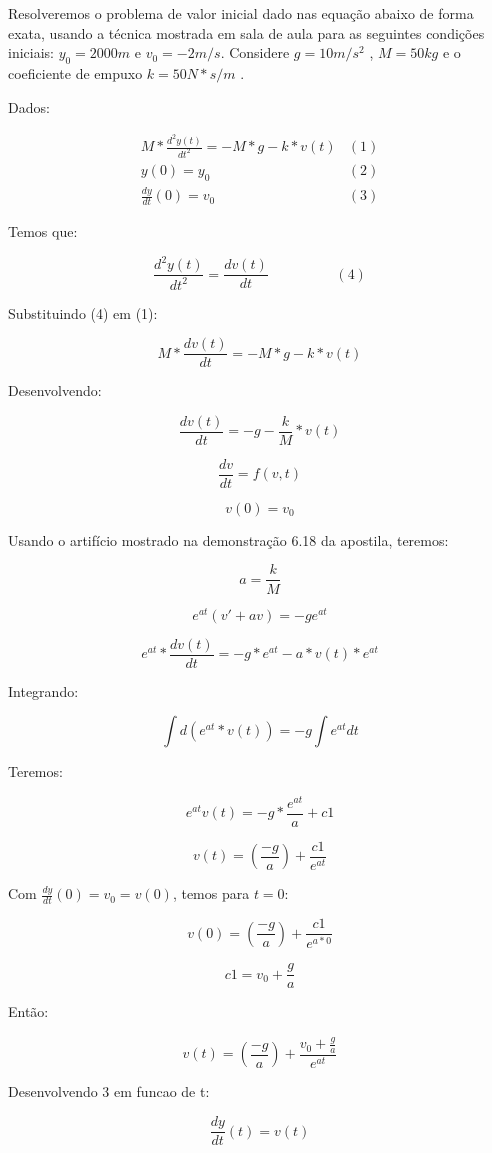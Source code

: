 \begin{example}
 Resolveremos o problema de valor inicial dado nas equação abaixo de forma exata, usando a técnica mostrada em sala de aula para as seguintes condições iniciais: $y_{0}=2000m$ e $v_{0}=-2m/s$. Considere $g=10m/s^{2}$ , $M = 50 kg$ e o coeficiente de empuxo $k = 50 N * s /m$ .

Dados:

\begin{eqnarray}
M*\frac{d^{2}y(t)}{dt^{2}}=-M*g-k*v(t) & (1)\\
y(0)=y_{0} & (2)\\
\frac{dy}{dt}(0)=v_{0} & (3)
\end{eqnarray}

Temos que:

$$\frac{d^{2}y(t)}{dt^{2}}=\frac{dv(t)}{dt}\hspace{2cm}(4)$$

Substituindo (4) em (1):

$$M*\frac{dv(t)}{dt}=-M*g-k*v(t)$$

Desenvolvendo:

$$\frac{dv(t)}{dt}=-g-\frac{k}{M}*v(t)$$

$$\frac{dv}{dt}=f(v,t)$$

$$v(0)=v_{0}$$

Usando o artifício mostrado na demonstração 6.18 da apostila, teremos:

$$a=\frac{k}{M}$$

$$e^{at}(v'+av)=-ge^{at}$$

$$e^{at}*\frac{dv(t)}{dt}=-g*e^{at}-a*v(t)*e^{at}$$

Integrando:

$$\int d(e^{at}*v(t))=-g\int e^{at}dt$$

Teremos:

$$e^{at}v(t)=-g*\frac{e^{at}}{a}+c1$$

$$v(t)=(\frac{-g}{a})+\frac{c1}{e^{at}}$$

Com $\frac{dy}{dt}(0)=v_{0}=v(0)$, temos para $t=0$:

$$v(0)=(\frac{-g}{a})+\frac{c1}{e^{a*0}}$$

$$c1=v_{0}+\frac{g}{a}$$

Então:

$$v(t)=(\frac{-g}{a})+\frac{v_{0}+\frac{g}{a}}{e^{at}}$$

Desenvolvendo 3 em funcao de t:

$$\frac{dy}{dt}(t)=v(t)$$


\end{example}
